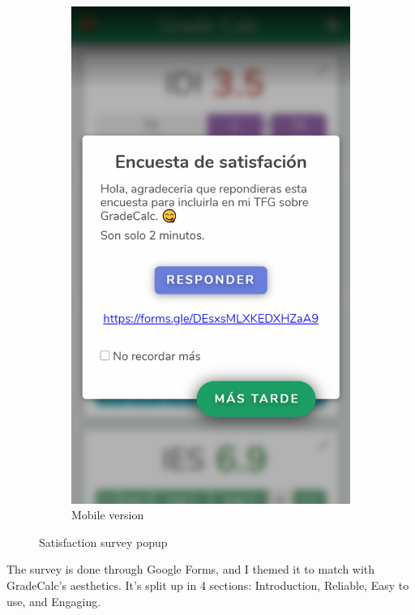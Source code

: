 \begin{figure}[ht!]
\begin{subfigure}[b]{0.243\textwidth-0.1cm}
        \includegraphics[width=\textwidth]{media/screenshots/screenshot-survey.png}
        \caption{Mobile version}
    \end{subfigure}
    \caption{Satisfaction survey popup}
    \label{fig:screenshot-survey-popup}
\end{figure}
\vfill

The survey is done through Google Forms, and I themed it to match with GradeCalc's aesthetics. It's split up in 4 sections: Introduction, Reliable, Easy to use, and Engaging.

